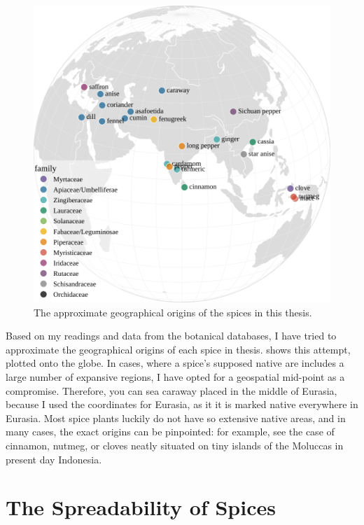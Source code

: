\begin{figure}[ht!]
    \includegraphics[width=\linewidth]{imgs/plots/spices_map.pdf}
    \caption{The approximate geographical origins of the spices in this thesis.}
    \label{fig:spices_map}
\end{figure}


Based on my readings and data from the botanical databases, I have tried to approximate the geographical origins of each spice in thesis.  shows this attempt, plotted onto the globe. In cases, where a spice's supposed native are includes a large number of expansive regions, I have opted for a geospatial mid-point as a compromise. Therefore, you can sea caraway placed in the middle of Eurasia, because I used the coordinates for Eurasia, as it it is marked native everywhere in Eurasia. Most spice plants luckily do not have so extensive native areas, and in many cases, the exact origins can be pinpointed: for example, see the case of cinnamon, nutmeg, or cloves neatly situated on tiny islands of the Moluccas in present day Indonesia. %



\section{The Spreadability of Spices}
\label{sec:spreadability}

